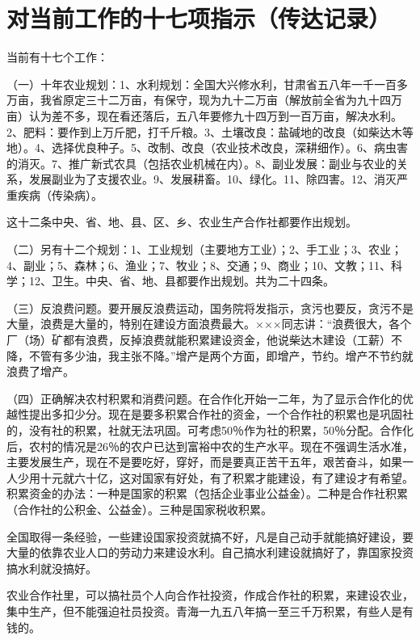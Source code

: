 \section[对当前工作的十七项指示（传达记录）（一九五八年四月）]{对当前工作的十七项指示（传达记录）}


当前有十七个工作：

（一）十年农业规划：1、水利规划：全国大兴修水利，甘肃省五八年一千一百多万亩，我省原定三十二万亩，有保守，现为九十二万亩（解放前全省为九十四万亩）认为差不多，现在看还落后，五八年要修九十四万到一百万亩，解决水利。2、肥料：要作到上万斤肥，打千斤粮。3、土壤改良：盐碱地的改良（如柴达木等地）。4、选择优良种子。5、改制、改良（农业技术改良，深耕细作）。6、病虫害的消灭。7、推广新式农具（包括农业机械在内）。8、副业发展：副业与农业的关系，发展副业为了支援农业。9、发展耕畜。10、绿化。11、除四害。12、消灭严重疾病（传染病）。

这十二条中央、省、地、县、区、乡、农业生产合作社都要作出规划。

（二）另有十二个规划：1、工业规划（主要地方工业）；2、手工业；3、农业；4、副业；5、森林；6、渔业；7、牧业；8、交通；9、商业；10、文教；11、科学；12、卫生。中央、省、地、县都要作出规划。共为二十四条。

（三）反浪费问题。要开展反浪费运动，国务院将发指示，贪污也要反，贪污不是大量，浪费是大量的，特别在建设方面浪费最大。×××同志讲：“浪费很大，各个厂（场）矿都有浪费，反掉浪费就能积累建设资金，他说柴达木建设（工薪）不降，不管有多少油，我主张不降。”增产是两个方面，即增产，节约。增产不节约就浪费了增产。

（四）正确解决农村积累和消费问题。在合作化开始一二年，为了显示合作化的优越性提出多扣少分。现在是要多积累合作社的资金，一个合作社的积累也是巩固社的，没有社的积累，社就无法巩固。可考虑50％作为社的积累，50％分配。合作化后，农村的情况是26％的农户已达到富裕中农的生产水平。现在不强调生活水准，主要发展生产，现在不是要吃好，穿好，而是要真正苦干五年，艰苦奋斗，如果一人少用十元就六十亿，这对国家有好处，有了积累才能建设，有了建设才有希望。积累资金的办法：一种是国家的积累（包括企业事业公益金）。二种是合作社积累（合作社的公积金、公益金）。三种是国家税收积累。

全国取得一条经验，一些建设国家投资就搞不好，凡是自己动手就能搞好建设，要大量的依靠农业人口的劳动力来建设水利。自己搞水利建设就搞好了，靠国家投资搞水利就没搞好。

农业合作社里，可以搞社员个人向合作社投资，作成合作社的积累，来建设农业，集中生产，但不能强迫社员投资。青海一九五八年搞一至三千万积累，有些人是有钱的。

